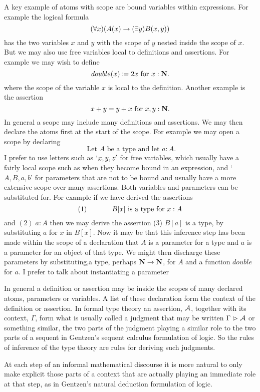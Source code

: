 {A key example of atoms with scope are bound variables within expressions.  For example the logical formula
  \[ (\forall x) (A(x)\rightarrow (\exists y) B(x,y))\]
has the two variables $x$ and $y$ with the scope of $y$ nested inside the scope of $x$.  But we may also use free variables local to definitions and assertions.  For example we may wish to define
  \[ double(x)\coloneqq2x\mbox{ for } x:{\bf N}.\]
where the scope of the variable $x$ is local to the definition.  Another example is the assertion
  \[ x+y = y+x \mbox{ for } x,y:{\bf N}.\]
In general a scope may include many definitions and assertions.  We may then declare the atoms first at the start of the scope.  For example we may open a scope by declaring
  \[ \mbox{ Let $A$ be a type and let $a:A$}.\]
I prefer to use letters such as $`x,y,z'$ for free variables, which usually have a fairly local scope such as when they become bound in an expression, and `$A,B,a,b$' for parameters that are not to be bound and usually have a more extensive scope over many assertions.  Both variables and parameters can be substituted for.
For example if we have derived the assertions
  \[ (1)\hspace{.5in}\mbox{$B[x]$ is a type for $x:A$}\] 
and $(2)\; a:A$ then we may derive the assertion  (3)\; $B[a]$ is a type,
by substituting $a$ for $x$ in $B[x]$.  Now it may be that this inference step has been made within the scope of a declaration that $A$ is a parameter for a type and $a$ is a parameter for an object of that type.  We might then discharge these parameters by substituting,a type, perhaps ${\bf N}\rightarrow{\bf N}$, for $A$ and a function $double$ for $a$.  I prefer to talk about instantiating a parameter

In general a definition or assertion may be inside the scopes of many declared atoms, parameters or variables.  A list of these declaration form the context of the definition or assertion.  In formal type theory an assertion, $\cal A$, together with its context, $\Gamma$, form what is usually called a judgment that may be written $\Gamma{\;\rhd\;} \cal A$ or something similar, the two parts of the judgment playing a similar role to the two parts of a sequent in Gentzen's sequent calculus formulation of logic.  So the rules of inference of the type theory are rules for deriving such judgments.

At each step of an informal mathematical discourse it is more natural to only make explicit those parts of a context that are actually playing an immediate role at that step, as in Gentzen's natural deduction formulation of logic.

}
